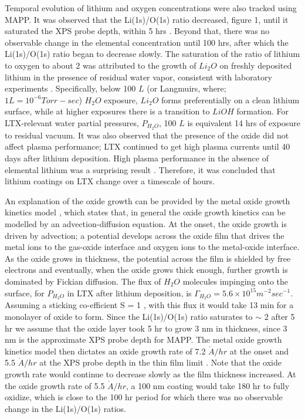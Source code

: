 \documentclass[%
 aip,
 amsmath,amssymb,
 reprint,%
]{revtex4-1}
\begin{document}
Temporal evolution of lithium and oxygen concentrations were also tracked using MAPP. It was observed that the Li(1s)/O(1s) ratio decreased, figure 1, until it saturated the XPS probe depth, within 5 hrs \cite{lucia-thesis,lucia-paper}. Beyond that, there was no observable change in the elemental concentration until 100 hrs, after which the Li(1s)/O(1s) ratio began to decrease slowly. The saturation of the ratio of lithium to oxygen to about $2$ was attributed to the growth of $Li_2O$ on freshly deposited lithium in the presence of residual water vapor, consistent with laboratory experiments \cite{50,51}.  Specifically, below 100 $L$ (or Langmuirs, where; $1 L = 10^{-6}Torr-sec$) $H_2O$ exposure, $Li_2O$ forms preferentially on a clean lithium surface, while at higher exposures there is a transition to $LiOH$ formation. For LTX-relevant water partial pressures, $P_{H_2O}$, 100 $L$ is equivalent 14 hrs of exposure to residual vacuum. It was also observed that the presence of the oxide did not affect plasma performance; LTX continued to get high plasma currents until 40 days after lithium deposition. High plasma performance in the absence of elemental lithium was a surprising result \cite{bob-lucia}. Therefore, it was concluded that lithium coatings on LTX change over a timescale of hours. 

An explanation of the oxide growth can be provided by the metal oxide growth kinetics model  \cite{53}, which states that, in general the oxide growth kinetics can be modelled by an advection-diffusion equation. At the onset, the oxide growth is driven by advection; a potential develops across the oxide film that drives the metal ions to the gas-oxide interface and oxygen ions to the metal-oxide interface. As the oxide grows in thickness, the potential across the film is shielded by free electrons and eventually, when the oxide grows thick enough, further growth is dominated by Fickian diffusion. The flux of $H_2O$ molecules impinging onto the surface, for $P_{H_2O}$ in LTX after lithium deposition, is $\Gamma_{H_2O} = 5.6 \times 10^{15} m^{-2}sec^{-1}$. Assuming a sticking co-efficient S = 1 \cite{51}, with this flux it would take 13 min for a monolayer of oxide to form. Since the Li(1s)/O(1s) ratio saturates to $\sim$ 2 after 5 hr \cite{lucia-thesis,lucia-paper} we assume that the oxide layer took 5 hr to grow 3 nm in thickness, since 3 nm is the approximate XPS probe depth for MAPP. The metal oxide growth kinetics model then dictates an oxide growth rate of 7.2 $\mathring{A}/hr$ at the onset and 5.5 $\mathring{A}/hr$ at the XPS probe depth in the thin film limit \cite{thin-film}. Note that the oxide growth rate would continue to decrease slowly as the film thickness increased. At the oxide growth rate of 5.5 $\mathring{A}/hr$, a 100 nm coating would take 180 hr to fully oxidize, which is close to the 100 hr period for which there was no observable change in the Li(1s)/O(1s) ratios. \cite{lucia-thesis,lucia-paper}
\end{document}
